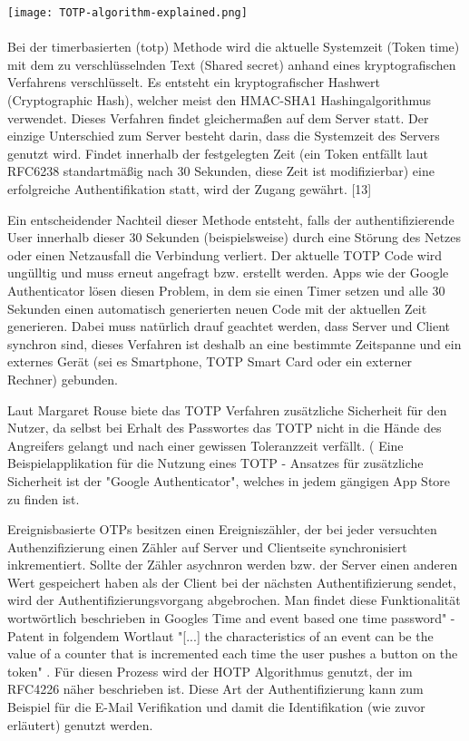 \texttt{[image: TOTP-algorithm-explained.png]} \\\\
Bei der timerbasierten (\ac{totp}) Methode wird die aktuelle Systemzeit (Token time) mit dem zu verschlüsselnden Text (Shared secret) anhand eines kryptografischen Verfahrens verschlüsselt. Es entsteht ein kryptografischer Hashwert (Cryptographic Hash), welcher meist den HMAC-SHA1 Hashingalgorithmus verwendet. Dieses Verfahren findet gleichermaßen auf dem Server statt. Der einzige Unterschied zum Server besteht darin, dass die Systemzeit des Servers genutzt wird. Findet innerhalb der festgelegten Zeit (ein Token entfällt laut RFC6238 standartmäßig nach 30 Sekunden, diese Zeit ist modifizierbar) eine erfolgreiche Authentifikation statt, wird der Zugang gewährt. [13]

Ein entscheidender Nachteil dieser Methode entsteht, falls der authentifizierende User innerhalb dieser 30 Sekunden (beispielsweise) durch eine Störung des Netzes oder einen Netzausfall die Verbindung verliert. Der aktuelle TOTP Code wird ungülltig und muss erneut angefragt bzw. erstellt werden. Apps wie der Google Authenticator lösen diesen Problem, in dem sie einen Timer setzen und alle 30 Sekunden einen automatisch generierten neuen Code mit der aktuellen Zeit generieren. Dabei muss natürlich drauf geachtet werden, dass Server und Client synchron sind, dieses Verfahren ist deshalb an eine bestimmte Zeitspanne und ein externes Gerät (sei es Smartphone, TOTP Smart Card oder ein externer Rechner) gebunden.

Laut Margaret Rouse biete das TOTP Verfahren zusätzliche Sicherheit für den Nutzer, da selbst bei Erhalt des Passwortes das TOTP nicht in die Hände des Angreifers gelangt und nach einer gewissen Toleranzzeit verfällt. (\cite{A5} Eine Beispielapplikation für die Nutzung eines TOTP - Ansatzes für zusätzliche Sicherheit ist der "Google Authenticator", welches in jedem gängigen App Store zu finden ist.

Ereignisbasierte OTPs besitzen einen Ereigniszähler, der bei jeder versuchten Authenzifizierung einen Zähler auf Server und Clientseite synchronisiert inkrementiert. Sollte der Zähler asychnron werden bzw. der Server einen anderen Wert gespeichert haben als der Client bei der nächsten Authentifizierung sendet, wird der Authentifizierungsvorgang abgebrochen. Man findet diese Funktionalität wortwörtlich beschrieben in Googles Time and event based one time password" - Patent \cite{A6} in folgendem Wortlaut "[...] the characteristics of an event can be the value of a counter that is incremented each time the user pushes a button on the token" \cite{A6}. Für diesen Prozess wird der HOTP Algorithmus genutzt, der im RFC4226 näher beschrieben ist. Diese Art der Authentifizierung kann zum Beispiel für die E-Mail Verifikation und damit die Identifikation (wie zuvor erläutert) genutzt werden.

